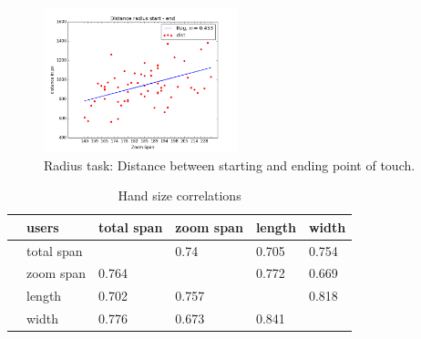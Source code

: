 \documentclass{sigchi}
\begin{document}
\begin{figure}[ht]
	\centering
  \includegraphics[width=0.5\textwidth]{figures/plotRadiusStartEnd.png}
	\caption{Radius task: Distance between starting and ending point of touch.}
	\label{plotRadiusStartEnd}
\end{figure}

\begin{table}[ht]
\centering
\caption{Hand size correlations}
\label{handSizeCorrelations}
\begin{tabular}{ll|llll}
 &users  &total span  &zoom span  &length  &width  \\ \hline
 &total span  &  &0.74  &0.705  &0.754 \\
 &zoom span  &0.764  &  &0.772  &0.669 \\
 &length  &0.702  &0.757  &  &0.818 \\
 &width  &0.776  &0.673  &0.841  &
\end{tabular}
\end{table}
\end{document}
